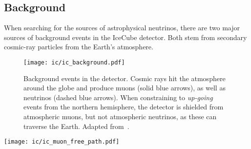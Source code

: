 \subsection{Background}\label{background}

When searching for the sources of astrophysical neutrinos, there are two major sources of background events in the IceCube detector. Both stem from secondary cosmic-ray particles from the Earth's atmosphere.

\begin{figure}[htb]
    \texttt{[image: ic/ic\_background.pdf]}
    \caption[Background events]{Background events in the detector. Cosmic rays hit the atmosphere around the globe and produce muons (solid blue arrows), as well as neutrinos (dashed blue arrows). When constraining to \textit{up-going} events from the northern hemisphere, the detector is shielded from atmospheric muons, but not atmospheric neutrinos, as these can traverse the Earth. Adapted from~\cite{Ahlers2018a}.}
\end{figure}

\begin{marginfigure}
    \texttt{[image: ic/ic\_muon\_free\_path.pdf]}
    \caption[Muon free path in ice]{Free path length for \SI{1}{\peta\eV} muons in ice. The mean free path in ice is slightly longer than in rock. From~\cite{Chirkin2004}.}
\end{marginfigure}

